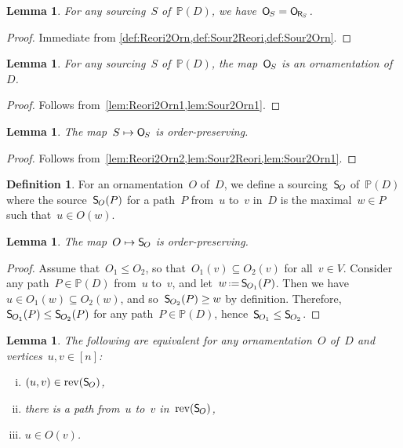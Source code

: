 \documentclass{amsart}
\newtheorem{lemma}[theorem]{Lemma}
\theoremstyle{definition}
\newtheorem{definition}[theorem]{Definition}
\newcommand{\eqdef}{\mbox{\,\raisebox{0.2ex}{\scriptsize\ensuremath{\mathrm:}}\ensuremath{=}\,}} %
\newcommand{\mymap}[2]{\mathsf{#1}_{\hspace{-.7pt}#2}}
\newcommand{\orn}[1]{\mymap{O}{#1}}  %
\newcommand{\reori}[1]{\mymap{R}{#1}}  %
\DeclareMathOperator{\rev}{rev} %
\newcommand{\sour}[1]{\mymap{S}{#1}}  %
\newcommand{\PP}{\mathbb P} %
\begin{document}
\begin{lemma}
\label{lem:Sour2Orn1}
For any sourcing~$S$ of~$\PP(D)$, we have~$\orn{S} = \orn{\reori{S}}$.
\end{lemma}

\begin{proof}
Immediate from \cref{def:Reori2Orn,def:Sour2Reori,def:Sour2Orn}.
\end{proof}

\begin{lemma}
\label{lem:Sour2Orn2}
For any sourcing~$S$ of~$\PP(D)$, the map~$\orn{S}$ is an ornamentation of~$D$.
\end{lemma}

\begin{proof}
Follows from~\cref{lem:Reori2Orn1,lem:Sour2Orn1}.
\end{proof}

\begin{lemma}
\label{lem:Sour2Orn3}
The map~$S \mapsto \orn{S}$ is order-preserving.
\end{lemma}

\begin{proof}
Follows from~\cref{lem:Reori2Orn2,lem:Sour2Reori,lem:Sour2Orn1}.
\end{proof}

\begin{definition}
\label{def:Orn2Sour}
For an ornamentation~$O$ of~$D$, we define a sourcing~$\sour{O}$ of~$\PP(D)$ where the source~$\sour{O}(P)$ for a path~$P$ from~$u$ to~$v$ in~$D$ is the maximal~$w \in P$ such that~$u \in O(w)$.
\end{definition}

\begin{lemma}
\label{lem:Orn2Sour1}
The map~$O \mapsto \sour{O}$ is order-preserving.
\end{lemma}

\begin{proof}
Assume that~$O_1 \le O_2$, so that~$O_1(v) \subseteq O_2(v)$ for all~$v \in V$.
Consider any path~$P \in \PP(D)$ from~$u$ to~$v$, and let~$w \eqdef \sour{O_1}(P)$.
Then we have~$u \in O_1(w) \subseteq O_2(w)$, and so~$\sour{O_2}(P) \ge w$ by definition.
Therefore, $\sour{O_1}(P) \le \sour{O_2}(P)$ for any path~$P \in \PP(D)$, hence~${\sour{O_1} \le \sour{O_2}}$.
\end{proof}

\begin{lemma}
\label{lem:Orn2Sour2}
The following are equivalent for any ornamentation~$O$ of~$D$ and vertices~$u,v \in [n]$:
\begin{enumerate}[(i)]
\item $(u,v) \in \rev(\sour{O})$,
\item there is a path from~$u$ to~$v$ in~$\rev(\sour{O})$,
\item $u \in O(v)$.
\end{enumerate}
\end{lemma}
\end{document}
